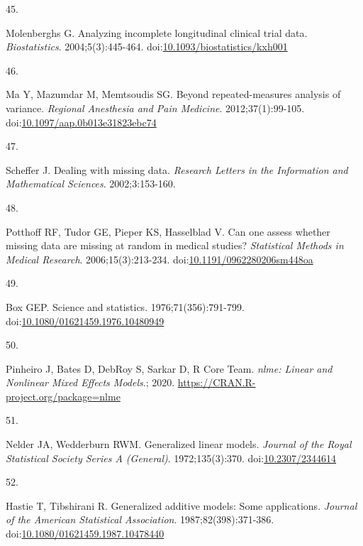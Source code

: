 \documentclass[
]{article}
\newlength{\cslhangindent}
\newlength{\csllabelwidth}
\newlength{\cslentryspacingunit} %
\newenvironment{CSLReferences}[2] %
 {%
  \setlength{\parindent}{0pt}
  \ifodd #1
  \let\oldpar\par
  \def\par{\hangindent=\cslhangindent\oldpar}
  \fi
  \setlength{\parskip}{#2\cslentryspacingunit}
 }%
 {}
\newcommand{\CSLLeftMargin}[1]{\parbox[t]{\csllabelwidth}{#1}}
\newcommand{\CSLRightInline}[1]{\parbox[t]{\linewidth - \csllabelwidth}{#1}\break}
\begin{document}
\begin{CSLReferences}{0}{0}
\leavevmode{}%
\CSLLeftMargin{45. }
\CSLRightInline{Molenberghs G. Analyzing incomplete longitudinal clinical trial data. \emph{Biostatistics}. 2004;5(3):445-464. doi:\href{https://doi.org/10.1093/biostatistics/kxh001}{10.1093/biostatistics/kxh001}}

\leavevmode{}%
\CSLLeftMargin{46. }
\CSLRightInline{Ma Y, Mazumdar M, Memtsoudis SG. Beyond repeated-measures analysis of variance. \emph{Regional Anesthesia and Pain Medicine}. 2012;37(1):99-105. doi:\href{https://doi.org/10.1097/aap.0b013e31823ebc74}{10.1097/aap.0b013e31823ebc74}}

\leavevmode{}%
\CSLLeftMargin{47. }
\CSLRightInline{Scheffer J. Dealing with missing data. \emph{Research Letters in the Information and Mathematical Sciences}. 2002;3:153-160.}

\leavevmode{}%
\CSLLeftMargin{48. }
\CSLRightInline{Potthoff RF, Tudor GE, Pieper KS, Hasselblad V. Can one assess whether missing data are missing at random in medical studies? \emph{Statistical Methods in Medical Research}. 2006;15(3):213-234. doi:\href{https://doi.org/10.1191/0962280206sm448oa}{10.1191/0962280206sm448oa}}

\leavevmode{}%
\CSLLeftMargin{49. }
\CSLRightInline{Box GEP. Science and statistics. 1976;71(356):791-799. doi:\href{https://doi.org/10.1080/01621459.1976.10480949}{10.1080/01621459.1976.10480949}}

\leavevmode{}%
\CSLLeftMargin{50. }
\CSLRightInline{Pinheiro J, Bates D, DebRoy S, Sarkar D, R Core Team. \emph{{nlme}: Linear and Nonlinear Mixed Effects Models}.; 2020. \url{https://CRAN.R-project.org/package=nlme}}

\leavevmode{}%
\CSLLeftMargin{51. }
\CSLRightInline{Nelder JA, Wedderburn RWM. Generalized linear models. \emph{Journal of the Royal Statistical Society Series A (General)}. 1972;135(3):370. doi:\href{https://doi.org/10.2307/2344614}{10.2307/2344614}}

\leavevmode{}%
\CSLLeftMargin{52. }
\CSLRightInline{Hastie T, Tibshirani R. Generalized additive models: Some applications. \emph{Journal of the American Statistical Association}. 1987;82(398):371-386. doi:\href{https://doi.org/10.1080/01621459.1987.10478440}{10.1080/01621459.1987.10478440}}


\end{CSLReferences}
\end{document}
